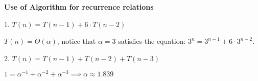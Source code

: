 \begin{example}
    \textbf{Use of Algorithm for recurrence relations}

    1. $T(n) = T(n-1) + 6 \cdot T(n-2)$

    $T(n) = \Theta(\alpha)$, notice that $\alpha = 3$ satisfies the equation: $3^n = 3^{n-1} + 6 \cdot 3^{n-2}$.

    2. $T(n) = T(n-1) + T(n-2) + T(n-3)$

    $1 = \alpha^{-1} + \alpha^{-2} + \alpha^{-3} \implies \alpha \approx 1.839$

\end{example}